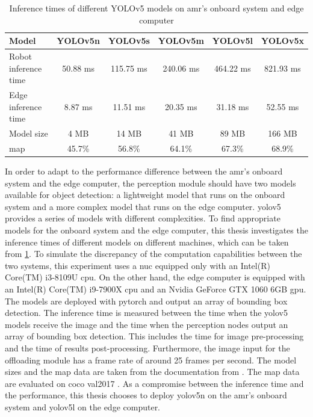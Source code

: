 \begin{table}[htb]%
    \centering%
    \begin{tabular}{lccccc}
        \toprule
        Model &                     YOLOv5n &   YOLOv5s &   YOLOv5m &   YOLOv5l &   YOLOv5x \\
        \midrule
        Robot inference time &      50.88 ms &  115.75 ms & 240.06 ms & 464.22 ms & 821.93 ms  \\
        Edge inference time &       8.87 ms &   11.51 ms &  20.35 ms &  31.18 ms &  52.55 ms  \\
        Model size &                4 MB &      14 MB &     41 MB &     89 MB &     166 MB    \\
        \acrshort{map} &                 45.7\% &    56.8\% &    64.1\% &    67.3\% &    68.9\%  \\
        \bottomrule
    \end{tabular}
    \caption{Inference times of different YOLOv5 models on \gls{amr}'s onboard system and edge computer}
    \label{tab:inference_time}%
\end{table}

In order to adapt to the performance difference between the \gls{amr}'s onboard system and the edge computer, the perception module should have two models available for object detection: a lightweight model that runs on the onboard system and a more complex model that runs on the edge computer. \gls{yolo}v5 provides a series of models with different complexities. To find appropriate models for the onboard system and the edge computer, this thesis investigates the inference times of different models on different machines, which can be taken from \cref{tab:inference_time}. To simulate the discrepancy of the computation capabilities between the two systems, this experiment uses a \gls{nuc} equipped only with an Intel(R) Core(TM) i3-8109U \gls{cpu}. On the other hand, the edge computer is equipped with an Intel(R) Core(TM) i9-7900X \gls{cpu} and an Nvidia GeForce GTX 1060 6GB \gls{gpu}. The models are deployed with \gls{pytorch} and output an array of bounding box detection. The inference time is measured between the time when the \gls{yolo}v5 models receive the image and the time when the perception nodes output an array of bounding box detection. This includes the time for image pre-processing and the time of results post-processing. Furthermore, the image input for the offloading module has a frame rate of around 25 frames per second. The model sizes and the \gls{map} data are taken from the documentation from \citeauthor*{Jocher2022} \cite{Jocher2022}. The \gls{map} data are evaluated on \gls{coco} val2017 \cite{Lin2014}. As a compromise between the inference time and the performance, this thesis chooses to deploy \gls{yolo}v5n on the \gls{amr}'s onboard system and \gls{yolo}v5l on the edge computer. 

